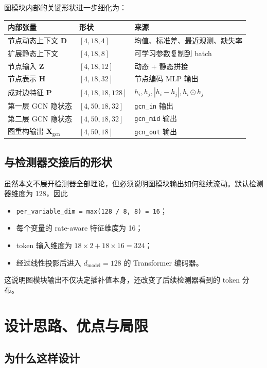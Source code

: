 \documentclass[UTF8]{ctexart}
\begin{document}
图模块内部的关键形状进一步细化为：
\begin{center}
\begin{tabular}{lll}
\toprule
内部张量 & 形状 & 来源 \\
\midrule
节点动态上下文 \(\bm{D}\) & \([4,18,4]\) & 均值、标准差、最近观测、缺失率 \\
扩展静态上下文 & \([4,18,8]\) & 可学习参数复制到 batch \\
节点输入 \(\bm{Z}\) & \([4,18,12]\) & 动态 + 静态拼接 \\
节点表示 \(\bm{H}\) & \([4,18,32]\) & 节点编码 MLP 输出 \\
成对边特征 \(\bm{P}\) & \([4,18,18,128]\) & \(h_i,h_j,|h_i-h_j|,h_i \odot h_j\) \\
第一层 GCN 隐状态 & \([4,50,18,32]\) & \verb|gcn_in| 输出 \\
第二层 GCN 隐状态 & \([4,50,18,32]\) & \verb|gcn_mid| 输出 \\
图重构输出 \(\bm{X}_{\text{gcn}}\) & \([4,50,18]\) & \verb|gcn_out| 输出 \\
\bottomrule
\end{tabular}
\end{center}

\subsection{与检测器交接后的形状}

虽然本文不展开检测器全部理论，但必须说明图模块输出如何继续流动。默认检测器维度为 128，因此
\begin{itemize}
    \item \verb|per_variable_dim = max(128 / 8, 8) = 16|；
    \item 每个变量的 rate-aware 特征维度为 16；
    \item token 输入维度为 \(18 \times 2 + 18 \times 16 = 324\)；
    \item 经过线性投影后进入 \(d_{\text{model}}=128\) 的 Transformer 编码器。
\end{itemize}

这说明图模块输出不仅决定插补值本身，还改变了后续检测器看到的 token 分布。

\section{设计思路、优点与局限}

\subsection{为什么这样设计}
\end{document}
